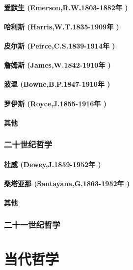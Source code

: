 \documentclass[UTF8]{../RepresentationUniverse}
\begin{document}
    \paragraph{爱默生 (Emerson,R.W.1803-1882年 )}
    \paragraph{哈利斯 (Harris,W.T.1835-1909年 )}
    \paragraph{皮尔斯 (Peirce,C.S.1839-1914年 )}
    \paragraph{詹姆斯 (James,W.1842-1910年 )}
    \paragraph{波温 (Bowne,B.P.1847-1910年 )}
    \paragraph{罗伊斯 (Royce,J.1855-1916年 )}
    \paragraph{其他}
\subsubsection{二十世纪哲学}
    \paragraph{杜威 (Dewey,J.1859-1952年 )}
    \paragraph{桑塔亚那 (Santayana,G.1863-1952年 )}
    \paragraph{其他}
\subsubsection{二十一世纪哲学}

    
\section{当代哲学}
\end{document}
